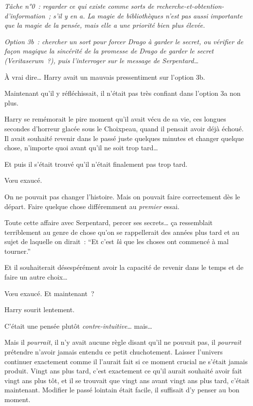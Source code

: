 \emph{Tâche n°0~: regarder ce qui existe comme sorts de recherche-et-obtention-d'information~; s'il y en a.
La magie de bibliothèques n'est pas aussi importante que la magie de la pensée, mais elle a une priorité bien plus élevée.}

\emph{Option 3b~: chercher un sort pour forcer Drago à garder le secret, ou vérifier de façon magique la sincérité de la promesse de Drago de garder le secret (Veritaserum~?), puis l'interroger sur le message de Serpentard…}

À vrai dire… Harry avait un mauvais pressentiment sur l'option 3b.

Maintenant qu'il y réfléchissait, il n'était pas très confiant dans l'option 3a non plus.

Harry se remémorait le pire moment qu'il avait vécu de sa vie, ces longues secondes d'horreur glacée sous le Choixpeau, quand il pensait avoir déjà échoué.
Il avait souhaité revenir dans le passé juste quelques minutes et changer quelque chose, n'importe quoi avant qu'il ne soit trop tard…

Et puis il s'était trouvé qu'il n'était finalement pas trop tard.

Vœu exaucé.

On ne pouvait pas changer l'histoire.
Mais on pouvait faire correctement dès le départ.
Faire quelque chose différemment au \emph{premier} essai.

Toute cette affaire avec Serpentard, percer ses secrets… ça ressemblait terriblement au genre de chose qu'on se rappellerait des années plus tard et au sujet de laquelle on dirait~: “Et c'est \emph{là} que les choses ont commencé à mal tourner.”

Et il souhaiterait désespérément avoir la capacité de revenir dans le temps et de faire un autre choix…

Vœu exaucé. Et maintenant~?

Harry sourit lentement.

C'était une pensée plutôt \emph{contre-intuitive}… mais…

Mais il \emph{pourrait}, il n'y avait aucune règle disant qu'il ne pouvait pas, il \emph{pourrait} prétendre n'avoir jamais entendu ce petit chuchotement.
Laisser l'univers continuer exactement comme il l'aurait fait si ce moment crucial ne s'était jamais produit.
Vingt ans plus tard, c'est exactement ce qu'il aurait souhaité avoir fait vingt ans plus tôt, et il se trouvait que vingt ans avant vingt ans plus tard, c'était maintenant.
Modifier le passé lointain était facile, il suffisait d'y penser au bon moment.

